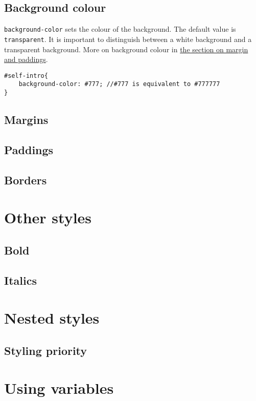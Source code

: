 \subsection{Background colour}

\texttt{background-color} sets the colour of the background. The default value is \texttt{transparent}. It is important to distinguish between a white background and a transparent background. More on background colour in \hyperref[sec:margin]{the section on margin and paddings}.

\begin{lstlisting}[language=pug]
#self-intro{
    background-color: #777; //#777 is equivalent to #777777
}
\end{lstlisting}

\subsection{Margins}

\subsection{Paddings}

\subsection{Borders}

\section{Other styles}

\subsection{Bold}

\subsection{Italics}

\section{Nested styles}
\label{sec:nestedstyles}

\subsection{Styling priority}

\section{Using variables}